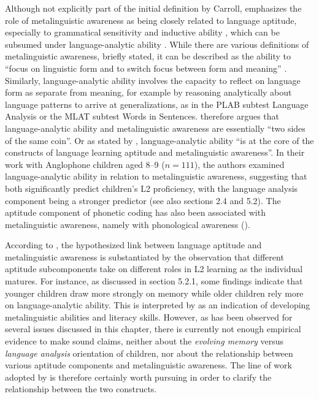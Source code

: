 \documentclass[output=paper]{langscibook}
\begin{document}
Although not explicitly part of the initial definition by Carroll, \citet{Singleton2014} emphasizes the role of metalinguistic awareness as being closely related to language aptitude, especially to grammatical sensitivity and inductive ability \citep{AldersonEtAl1997}, which can be subsumed under language-ana\-ly\-tic ability \citep{Skehan1998}. While there are various definitions of metalinguistic awareness, briefly stated, it can be described as the ability to “focus on linguistic form and to switch focus between form and meaning” \citep[277]{Jessner2008}. Similarly, language-ana\-ly\-tic ability involves the capacity to reflect on language form as separate from meaning, for example by reasoning analytically about language patterns to arrive at generalizations, as in the PLAB subtest Language Analysis or the MLAT subtest Words in Sentences. \citet[163]{Ranta2002} therefore argues that language-analytic ability and metalinguistic awareness are essentially “two sides of the same coin”. Or as stated by \citet[1111]{RoehrBrackinTellier2019}, language-analytic ability “is at the core of the constructs of language learning aptitude and metalinguistic awareness”. In their work with Anglophone children aged 8--9 ($n=111$), the authors examined language-analytic ability in relation to metalinguistic awareness, suggesting that both significantly predict children’s L2 proficiency, with the language analysis component being a stronger predictor (see also sections 2.4 and 5.2). The aptitude component of phonetic coding has also been associated with metalinguistic awareness, namely with phonological awareness (\citealt{RoehrBrackinTellier2019}).

According to \citet{RoehrBrackinTellier2019}, the hypothesized link between language aptitude and metalinguistic awareness is substantiated by the observation that different aptitude subcomponents take on different roles in L2 learning as the individual matures. For instance, as discussed in section 5.2.1, some findings indicate that younger children draw more strongly on memory while older children rely more on language-analytic ability. This is interpreted by \citet{RoehrBrackinTellier2019} as an indication of developing metalinguistic abilities and literacy skills. However, as has been observed for several issues discussed in this chapter, there is currently not enough empirical evidence to make sound claims, neither about the \textit{evolving memory} versus \textit{language analysis} orientation of children, nor about the relationship between various aptitude components and metalinguistic awareness. The line of work adopted by \citet{RoehrBrackinTellier2019} is therefore certainly worth pursuing in order to clarify the relationship between the two constructs.
\end{document}

